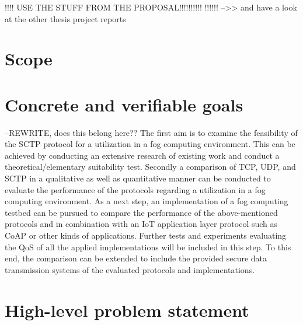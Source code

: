 !!!!
USE THE STUFF FROM THE PROPOSAL!!!!!!!!!!
!!!!!!
-->> and have a look at the other thesis project reports



\section{Scope}
\label{sec:delimit}



\section{Concrete and verifiable goals}
\label{sec:goals}
--REWRITE, does this belong here??
The first aim is to examine the feasibility of the SCTP protocol for a utilization in a fog computing environment. This can be achieved by conducting an extensive research of existing work and conduct a theoretical/elementary suitability test. Secondly a comparison of TCP, UDP, and SCTP in a qualitative as well as quantitative manner can be conducted to evaluate the performance of the protocols regarding a utilization in a fog computing environment. As a next step, an implementation of a fog computing testbed can be pursued to compare the performance of the above-mentioned protocols and in combination with an IoT application layer protocol such as CoAP or other kinds of applications. Further tests and experiments evaluating the QoS of all the applied implementations will be included in this step.
To this end, the comparison can be extended to include the provided secure data transmission systems of the evaluated protocols and implementations.



\section{High-level problem statement}
\label{sec:aim}


